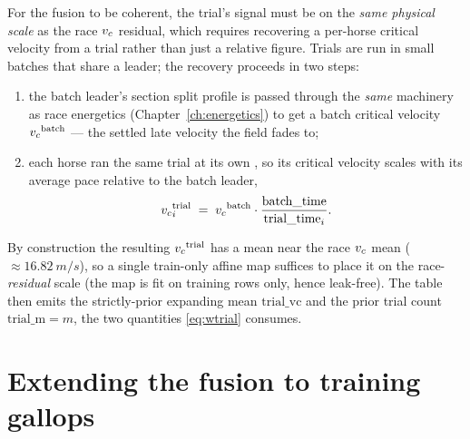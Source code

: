 For the fusion to be coherent, the trial's signal must be on the \emph{same physical scale} as the
race ${v_{c}}$ residual, which requires recovering a per-horse critical velocity from a trial rather
than just a relative figure. Trials are run in small batches that share a leader; the recovery
proceeds in two steps:
\begin{enumerate}[label=(\roman*)]
  \item the batch leader's section split profile is passed through the \emph{same}
         machinery as race energetics (Chapter~\ref{ch:energetics})
        to get a batch critical velocity ${v_{c}}^{\text{batch}}$ --- the settled late velocity the
        field fades to;
  \item each horse ran the same trial at its own , so its critical velocity
        scales with its average pace relative to the batch leader,
        \begin{equation}
          {v_{c}}^{\text{trial}}_i \;=\; {v_{c}}^{\text{batch}}\cdot
           \frac{\text{batch\_time}}{\text{trial\_time}_i}.
          \label{eq:trialvc}
        \end{equation}
\end{enumerate}
By construction the resulting ${v_{c}}^{\text{trial}}$ has a mean near the race ${v_{c}}$ mean
($\approx \SI{16.82}{m/s}$), so a single train-only affine map suffices to place it on the
race-\emph{residual} scale (the map is fit on training rows only, hence leak-free). The table then
emits the strictly-prior expanding mean $\mathrm{trial\_vc}$ and the prior trial count
$\mathrm{trial\_m}=m$, the two quantities \eqref{eq:wtrial} consumes.

\section{Extending the fusion to training gallops}
\label{sec:gallop}

